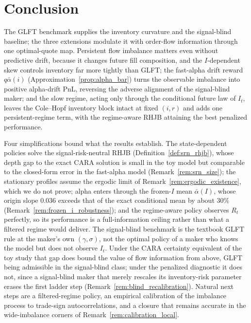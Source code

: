 \documentclass[11pt,a4paper]{article}
\newcommand{\alphabar}{\bar\alpha}
\theoremstyle{plain}
\theoremstyle{definition}
\begin{document}
\section{Conclusion}
\label{sec:conclusion}

The GLFT benchmark supplies the inventory curvature and the signal-blind
baseline; the three extensions modulate it with order-flow information through
one optimal-quote map.  Persistent flow imbalance matters even without
predictive drift, because it changes future fill composition, and the
\(I\)-dependent skew controls inventory far more tightly than GLFT; the
fast-alpha drift reward \(q\alphabar(i)\) (Approximation~\ref{prop:alpha_bar})
turns the observable imbalance into positive alpha-drift PnL, reversing the
adverse alignment of the signal-blind maker; and the slow regime, acting only
through the conditional future law of \(I_t\), leaves the Cole--Hopf inventory
block intact at fixed \((i,r)\) and adds one persistent-regime term, with the
regime-aware RHJB attaining the best penalized performance.

Four simplifications bound what the results establish.  The state-dependent
policies solve the signal-risk-neutral RHJB (Definition~\ref{def:srn_rhjb}),
whose depth gap to the exact CARA solution is small in the toy model but
comparable to the closed-form error in the fast-alpha model
(Remark~\ref{rem:srn_size}); the stationary profiles assume the ergodic limit
of Remark~\ref{rem:ergodic_existence}, which we do not prove; alpha enters
through the frozen-\(I\) mean \(\alphabar(I)\), whose origin slope \(0.036\)
exceeds that of the exact conditional mean by about \(30\%\)
(Remark~\ref{rem:frozen_i_robustness});
and the regime-aware policy observes \(R_t\) perfectly, so its performance is
a full-information ceiling rather than what a filtered regime would deliver.
The signal-blind benchmark is the textbook GLFT rule at the maker's own
\((\gamma,\sigma)\), not the optimal policy of a maker who knows the model but
does not observe \(I_t\).  Under the CARA certainty equivalent of the toy study
that gap does bound the value of flow information from above, GLFT being
admissible in the signal-blind class; under the penalized diagnostic it does
not, since a signal-blind maker that merely rescales its inventory-risk
parameter erases the first ladder step
(Remark~\ref{rem:blind_recalibration}).  Natural next steps are a filtered-regime policy, an
empirical calibration of the imbalance process to trade-sign
autocorrelations, and a closure that remains accurate in the wide-imbalance
corners of Remark~\ref{rem:calibration_local}.
\end{document}
